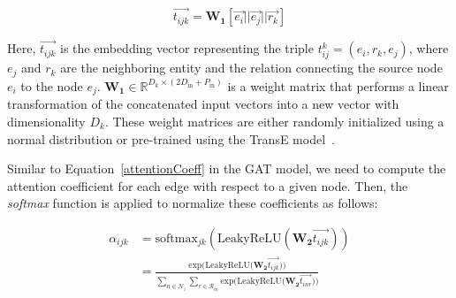 \begin{equation}
	\label{attentionWithRelation}
	\overrightarrow{t_{ijk}} = \mathbf{W_1} [\overrightarrow{e_i} || \overrightarrow{e_j} || \overrightarrow{r_k}]
\end{equation}

Here, $\overrightarrow{t_{ijk}}$ is the embedding vector representing the triple $t_{ij}^k = (e_i, r_k, e_j)$, where $e_j$ and $r_k$ are the neighboring entity and the relation connecting the source node $e_i$ to the node $e_j$. $\mathbf{W_1} \in \mathbb{R}^{D_k \times (2 D_{\text{in}} + P_{\text{in}})}$ is a weight matrix that performs a linear transformation of the concatenated input vectors into a new vector with dimensionality $D_k$. These weight matrices are either randomly initialized using a normal distribution or pre-trained using the TransE model~\cite{bordes2013translating}.

Similar to Equation~\ref{attentionCoeff} in the GAT model, we need to compute the attention coefficient for each edge with respect to a given node. Then, the \textit{softmax} function is applied to normalize these coefficients as follows:

\begin{equation}
	\label{attentionRelationCoeff}
	\begin{split}
		\alpha_{ijk}& = \text{softmax}_{jk}(\text{LeakyReLU}(\mathbf{W_2} \overrightarrow{t_{ijk}}))\\
		&= \frac{
			\text{exp} \Big( \text{LeakyReLU} \Big( \mathbf{W_2} \overrightarrow{t_{ijk}}\Big) \Big)
		}
		{
			\sum_{n\in \mathcal{N}_i} \sum_{r\in \mathcal{R}_{in}}
			\text{exp} \Big( \text{LeakyReLU} \Big( \mathbf{W_2} \overrightarrow{t_{inr}} \Big) \Big)
		}
	\end{split}
\end{equation}


